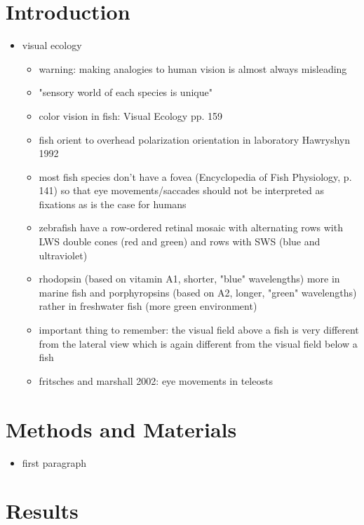 \documentclass[a4paper,10pt]{scrartcl}
\begin{document}
	\section{Introduction}
	\begin{itemize}
		\item visual ecology
		\begin{itemize}
			\item warning: making analogies to human vision is almost always misleading
			\item "sensory world of each species is unique"
			\item color vision in fish: Visual Ecology pp. 159
			\item fish orient to overhead polarization orientation in laboratory Hawryshyn 1992
			\item most fish species don't have a fovea (Encyclopedia of Fish Physiology, p. 141) so that eye movements/saccades should not be interpreted as fixations as is the case for humans
			\item zebrafish have a row-ordered retinal mosaic with alternating rows with LWS double cones (red and green) and rows with SWS (blue and ultraviolet)
			\item rhodopsin (based on vitamin A1, shorter, "blue" wavelengths) more in marine fish and porphyropsins (based on A2, longer, "green" wavelengths) rather in freshwater fish (more green environment)
			\item important thing to remember: the visual field above a fish is very different from the lateral view which is again different from the visual field below a fish
			\item fritsches and marshall 2002: eye movements in teleosts
			
		\end{itemize}
	\end{itemize}
	\section{Methods and Materials}
	\begin{itemize}
		\item first paragraph
	\end{itemize}
	\section{Results}
\end{document}
